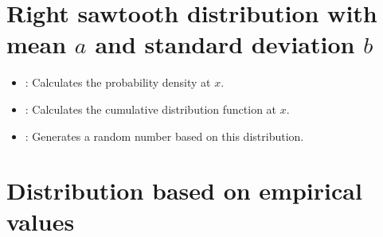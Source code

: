 \section{Right sawtooth distribution with mean \texorpdfstring{$a$}{a} and standard deviation \texorpdfstring{$b$}{b}}

\begin{itemize}

\item
{}:
Calculates the probability density at $x$.

\item
{}:
Calculates the cumulative distribution function at $x$.

\item
{}:
Generates a random number based on this distribution.

\end{itemize}



\section{Distribution based on empirical values}

